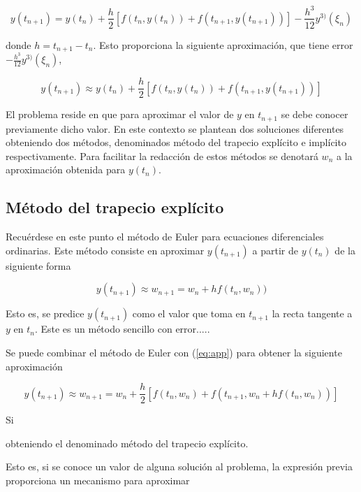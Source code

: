 \documentclass{article}
\theoremstyle{theorem-style}  %
\theoremstyle{definition}
\theoremstyle{example-style}
\begin{document}
	\begin{equation}
		y(t_{n+1}) = y(t_n) + \frac{h}{2} \left[f(t_n,y(t_n)) + f(t_{n+1}, y(t_{n+1}))\right] - \frac{h^3}{12}y^{3)}(\xi_n)
	\end{equation}


	donde $h = t_{n+1}-t_n$. Esto proporciona la siguiente aproximación, que tiene error $- \frac{h^3}{12}y^{3)}(\xi_n)$,

	\begin{equation} \label{eq:app}
		y(t_{n+1}) \approx y(t_n) + \frac{h}{2} \left[f(t_n,y(t_n)) + f(t_{n+1}, y(t_{n+1}))\right]
	\end{equation}

	El problema reside en que para aproximar el valor de $y$ en $t_{n+1}$ se debe conocer previamente dicho valor. En este contexto se plantean dos soluciones diferentes obteniendo dos métodos, denominados método del trapecio explícito e implícito respectivamente. Para facilitar la redacción de estos métodos se denotará $w_n$ a la aproximación obtenida para $y(t_n)$.
	
	\subsection{Método del trapecio explícito}
		
		Recuérdese en este punto el método de Euler para ecuaciones diferenciales ordinarias. Este método consiste en aproximar $y(t_{n+1})$ a partir de $y(t_n)$ de la siguiente forma
		
		\begin{equation}
			y(t_{n+1}) \approx w_{n+1} = w_n + h f(t_n,w_n))
		\end{equation}

		Esto es, se predice $y(t_{n+1})$ como el valor que toma en $t_{n+1}$ la recta tangente a $y$ en $t_n$. Este es un método sencillo con error.....

		Se puede combinar el método de Euler con (\ref{eq:app}) para obtener la siguiente aproximación

		\begin{equation} \label{eq:app-exp}
			y(t_{n+1}) \approx w_{n+1} = w_n + \frac{h}{2} \left[f(t_n,w_n) + f(t_{n+1}, w_n + h f(t_n,w_n))\right]
		\end{equation}

		Si 
		
		obteniendo el denominado método del trapecio explícito. 
  
  Esto es, si se conoce un valor de alguna solución al problema, la expresión previa proporciona un mecanismo para aproximar 
\end{document}
